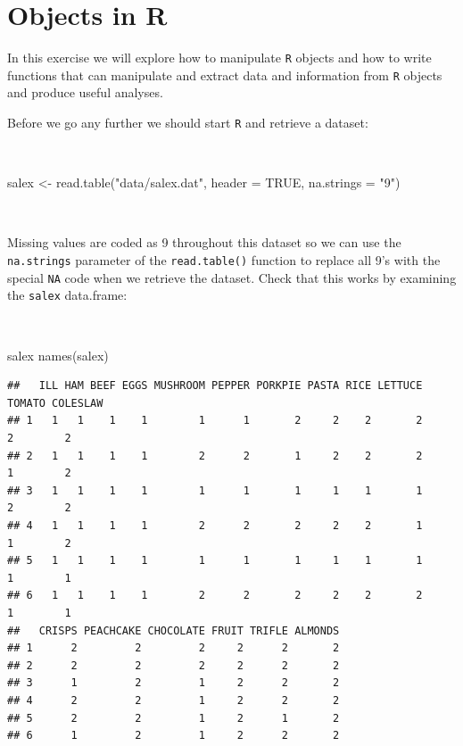 \documentclass[
  12pt,
]{book}
\newenvironment{Shaded}{\begin{snugshade}}{\end{snugshade}}
\newcommand{\AttributeTok}[1]{\textcolor[rgb]{0.77,0.63,0.00}{#1}}
\newcommand{\ConstantTok}[1]{\textcolor[rgb]{0.00,0.00,0.00}{#1}}
\newcommand{\FunctionTok}[1]{\textcolor[rgb]{0.00,0.00,0.00}{#1}}
\newcommand{\NormalTok}[1]{#1}
\newcommand{\OtherTok}[1]{\textcolor[rgb]{0.56,0.35,0.01}{#1}}
\newcommand{\StringTok}[1]{\textcolor[rgb]{0.31,0.60,0.02}{#1}}
\begin{document}
\hypertarget{create-manipulate-r}{%
\chapter{Objects in R}\label{create-manipulate-r}}

In this exercise we will explore how to manipulate \texttt{R} objects and how to write functions that can manipulate and extract data and information from \texttt{R} objects and produce useful analyses.

Before we go any further we should start \texttt{R} and retrieve a dataset:

~

\begin{Shaded}
\begin{Highlighting}[]
\NormalTok{salex }\OtherTok{\textless{}{-}} \FunctionTok{read.table}\NormalTok{(}\StringTok{"data/salex.dat"}\NormalTok{, }\AttributeTok{header =} \ConstantTok{TRUE}\NormalTok{, }\AttributeTok{na.strings =} \StringTok{"9"}\NormalTok{)}
\end{Highlighting}
\end{Shaded}

~

Missing values are coded as 9 throughout this dataset so we can use the \texttt{na.strings} parameter of the \texttt{read.table()} function to replace all 9's with the special \texttt{NA} code when we retrieve the dataset. Check that this works by examining the \texttt{salex} data.frame:

~

\begin{Shaded}
\begin{Highlighting}[]
\NormalTok{salex}
\FunctionTok{names}\NormalTok{(salex)}
\end{Highlighting}
\end{Shaded}

\begin{verbatim}
##   ILL HAM BEEF EGGS MUSHROOM PEPPER PORKPIE PASTA RICE LETTUCE TOMATO COLESLAW
## 1   1   1    1    1        1      1       2     2    2       2      2        2
## 2   1   1    1    1        2      2       1     2    2       2      1        2
## 3   1   1    1    1        1      1       1     1    1       1      2        2
## 4   1   1    1    1        2      2       2     2    2       1      1        2
## 5   1   1    1    1        1      1       1     1    1       1      1        1
## 6   1   1    1    1        2      2       2     2    2       2      1        1
##   CRISPS PEACHCAKE CHOCOLATE FRUIT TRIFLE ALMONDS
## 1      2         2         2     2      2       2
## 2      2         2         2     2      2       2
## 3      1         2         1     2      2       2
## 4      2         2         1     2      2       2
## 5      2         2         1     2      1       2
## 6      1         2         1     2      2       2
\end{verbatim}
\end{document}
